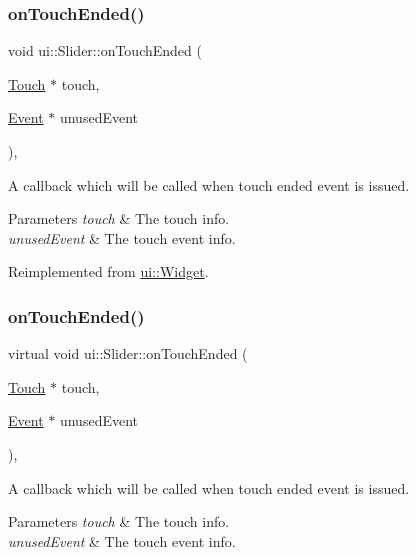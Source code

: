 \subsubsection{\texorpdfstring{on\+Touch\+Ended()}{onTouchEnded()}\hspace{0.1cm}{\footnotesize\ttfamily [1/2]}}
{\footnotesize\ttfamily void ui\+::\+Slider\+::on\+Touch\+Ended (\begin{DoxyParamCaption}\item[{\hyperlink{classTouch}{Touch} $\ast$}]{touch,  }\item[{\hyperlink{classEvent}{Event} $\ast$}]{unused\+Event }\end{DoxyParamCaption})\hspace{0.3cm}{\ttfamily [override]}, {\ttfamily [virtual]}}

A callback which will be called when touch ended event is issued. 
\begin{DoxyParams}{Parameters}
{\em touch} & The touch info. \\
\hline
{\em unused\+Event} & The touch event info. \\
\hline
\end{DoxyParams}


Reimplemented from \hyperlink{classui_1_1Widget_ac4d1576dfe1f3cf0a509f2d2ca0c5b90}{ui\+::\+Widget}.

\mbox{\label{classui_1_1Slider_a4729193d3c8dd8d1426f97a4ec13869e}} 
\subsubsection{\texorpdfstring{on\+Touch\+Ended()}{onTouchEnded()}\hspace{0.1cm}{\footnotesize\ttfamily [2/2]}}
{\footnotesize\ttfamily virtual void ui\+::\+Slider\+::on\+Touch\+Ended (\begin{DoxyParamCaption}\item[{\hyperlink{classTouch}{Touch} $\ast$}]{touch,  }\item[{\hyperlink{classEvent}{Event} $\ast$}]{unused\+Event }\end{DoxyParamCaption})\hspace{0.3cm}{\ttfamily [override]}, {\ttfamily [virtual]}}

A callback which will be called when touch ended event is issued. 
\begin{DoxyParams}{Parameters}
{\em touch} & The touch info. \\
\hline
{\em unused\+Event} & The touch event info. \\
\hline
\end{DoxyParams}


